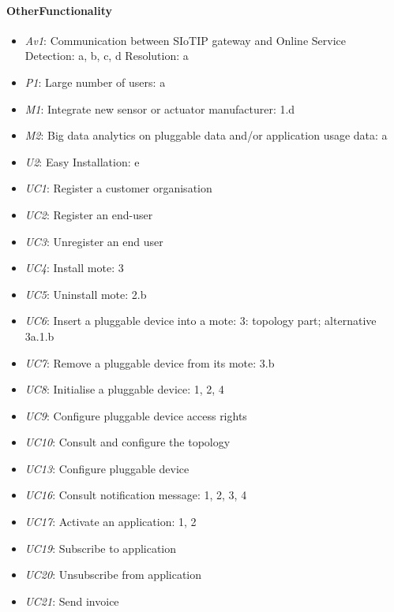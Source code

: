     \paragraph{OtherFunctionality}
        \begin{itemize}
            \item \emph{Av1}: Communication between SIoTIP gateway and Online Service \\
                               Detection: a, b, c, d
                               Resolution: a
           	\item \emph{P1}: Large number of users: a
            \item \emph{M1}: Integrate new sensor or actuator manufacturer: 1.d
            \item \emph{M2}: Big data analytics on pluggable data and/or application usage data: a
            \item \emph{U2}: Easy Installation: e
            \item \emph{UC1}: Register a customer organisation
            \item \emph{UC2}: Register an end-user
            \item \emph{UC3}: Unregister an end user
            \item \emph{UC4}: Install mote: 3
            \item \emph{UC5}: Uninstall mote: 2.b
            \item \emph{UC6}: Insert a pluggable device into a mote: 3: topology part; alternative 3a.1.b
            \item \emph{UC7}: Remove a pluggable device from its mote: 3.b
            \item \emph{UC8}: Initialise a pluggable device: 1, 2, 4
            \item \emph{UC9}: Configure pluggable device access rights
            \item \emph{UC10}: Consult and configure the topology
            \item \emph{UC13}: Configure pluggable device
            \item \emph{UC16}: Consult notification message: 1, 2, 3, 4
            \item \emph{UC17}: Activate an application: 1, 2
            \item \emph{UC19}: Subscribe to application
            \item \emph{UC20}: Unsubscribe from application
            \item \emph{UC21}: Send invoice

\end{itemize}

